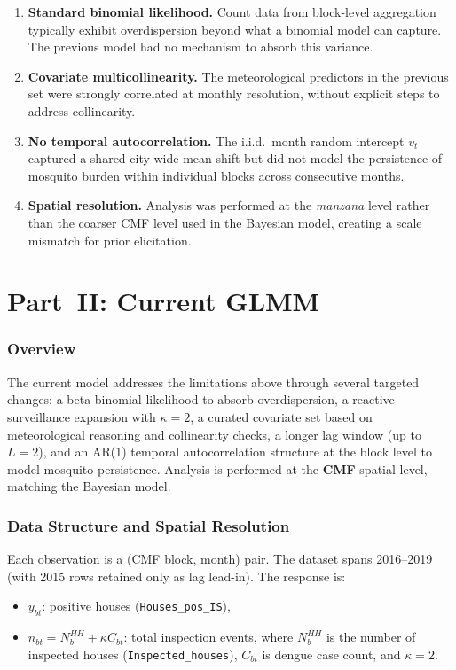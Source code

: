 \documentclass[12pt,a4paper]{article}
\begin{document}
\begin{enumerate}
  \item \textbf{Standard binomial likelihood.} Count data from block-level aggregation typically exhibit overdispersion beyond what a binomial model can capture. The previous model had no mechanism to absorb this variance.
  \item \textbf{Covariate multicollinearity.} The meteorological predictors in the previous set were strongly correlated at monthly resolution, without explicit steps to address collinearity.
  \item \textbf{No temporal autocorrelation.} The i.i.d.\ month random intercept $v_t$ captured a shared city-wide mean shift but did not model the persistence of mosquito burden within individual blocks across consecutive months.
  \item \textbf{Spatial resolution.} Analysis was performed at the \emph{manzana} level rather than the coarser CMF level used in the Bayesian model, creating a scale mismatch for prior elicitation.
\end{enumerate}

\part*{Part~II: Current GLMM}

\section{Overview}

The current model addresses the limitations above through several targeted changes: a beta-binomial likelihood to absorb overdispersion, a reactive surveillance expansion with $\kappa = 2$, a curated covariate set based on meteorological reasoning and collinearity checks, a longer lag window (up to $L = 2$), and an AR(1) temporal autocorrelation structure at the block level to model mosquito persistence. Analysis is performed at the \textbf{CMF} spatial level, matching the Bayesian model.

\section{Data Structure and Spatial Resolution}

Each observation is a (CMF block, month) pair. The dataset spans 2016--2019 (with 2015 rows retained only as lag lead-in). The response is:
\begin{itemize}
  \item $y_{bt}$: positive houses (\texttt{Houses\_pos\_IS}),
  \item $n_{bt} = N_b^{HH} + \kappa C_{bt}$: total inspection events, where $N_b^{HH}$ is the number of inspected houses (\texttt{Inspected\_houses}), $C_{bt}$ is dengue case count, and $\kappa = 2$.
\end{itemize}
\end{document}
